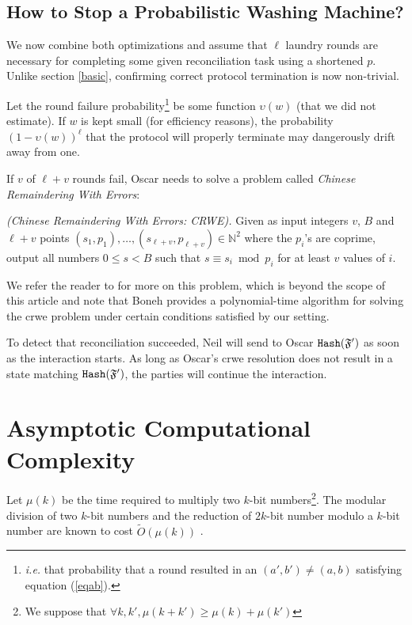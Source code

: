 \documentclass[11pt]{llncs}
\newcommand{\Oapp}{\ensuremath{\tilde{O}}}
\begin{document}
\subsection{How to Stop a Probabilistic Washing Machine?} We now combine both optimizations and assume that $\ell$ laundry rounds are necessary for completing some given reconciliation task using a shortened $p$. Unlike section \ref{basic}, confirming correct protocol termination is now non-trivial.\smallskip

Let the round failure probability\footnote{{\sl i.e.} that probability that a round resulted in an $(a',b')\neq (a,b)$ satisfying equation (\ref{eqab}).} be some function $\upsilon(w)$ (that we did not estimate). If $w$ is kept small (for efficiency reasons), the probability $\left(1-\upsilon(w)\right)^{\ell}$ that the protocol will properly terminate may dangerously drift away from one.\smallskip

If $v$ of $\ell+v$ rounds fail, Oscar needs to solve a problem called {\sl Chinese Remaindering With Errors}:\smallskip

\begin{problem}{\sl (Chinese Remaindering With Errors: CRWE).} Given as input integers $v$, $B$ and $\ell+v$ points $(s_1,p_1),\ldots,(s_{\ell+v},p_{\ell+v})\in \mathbb{N}^2$ where the $p_i$'s are coprime, output all numbers $0 \leq s < B$ such that $s \equiv s_i \bmod p_i$ for at least $v$ values of $i$.
\end{problem}

We refer the reader to \cite{phong} for more on this problem, which is beyond the scope of this article and note that Boneh \cite{boneh} provides a polynomial-time algorithm for solving the {\sc crwe} problem under certain conditions satisfied by our setting.\smallskip

To detect that reconciliation succeeded, Neil will send to Oscar $\mbox{{\tt Hash}}(\mathfrak{F}')$ as soon as the interaction starts. As long as Oscar's {\sc crwe} resolution does not result in a state matching $\mbox{{\tt Hash}}(\mathfrak{F}')$, the parties will continue the interaction.

\section{Asymptotic Computational Complexity}

Let $\mu(k)$ be the time required to multiply two $k$-bit numbers\footnote{We suppose that $\forall k,k', \mu(k+k') \ge \mu(k) + \mu(k')$}.
The modular division of two $k$-bit numbers and the reduction of $2k$-bit number modulo a $k$-bit number are known to cost $\Oapp(\mu(k))$ \cite{burnikel1998fast}.\smallskip
\end{document}
